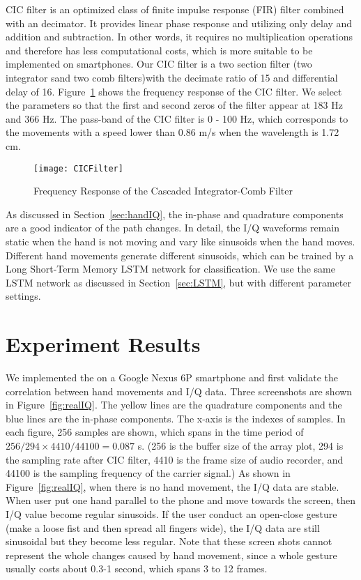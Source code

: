 CIC filter is an optimized class of finite impulse response (FIR) filter combined with an decimator. It provides linear phase response and 
utilizing only delay and addition and subtraction. In other words, it requires no multiplication operations and therefore has less computational costs, which is more suitable to be implemented on smartphones.
%
Our CIC filter is a two section filter (two integrator sand two comb filters)with the decimate ratio of 15 and differential delay of 16. Figure~\ref{fig:CICFilter} shows the frequency response of the CIC filter. We select the parameters so that the first and second zeros of the filter appear at 183 Hz and 366 Hz. The pass-band of the CIC filter is 0 - 100 Hz, which corresponds to the movements with a speed lower than 0.86 m/s when the wavelength is 1.72 cm. 

\begin{figure}[h]
	\centering
	\texttt{[image: CICFilter]}
	\caption{Frequency Response of the Cascaded Integrator-Comb Filter}
	\label{fig:CICFilter}
\end{figure}

As discussed in Section~\ref{sec:handIQ}, the in-phase and quadrature components are a good indicator of the path changes. In detail, the I/Q waveforms remain static when the hand is not moving and vary like sinusoids when the hand moves. Different hand movements generate different sinusoids, which can be trained by a Long Short-Term Memory LSTM network for classification.  We use the same LSTM network as discussed in Section~\ref{sec:LSTM}, but with different parameter settings.

\section{Experiment Results}

We implemented the {\uu} on a Google Nexus 6P smartphone and first validate the correlation between hand movements and I/Q data.
Three screenshots are shown in Figure~\ref{fig:realIQ}. The yellow lines are the quadrature components and the blue lines are the in-phase components. The x-axis is the indexes of samples. In each figure, 256 samples are shown, which spans in the time period of $256/294\times4410/44100 = 0.087$ s. (256 is the buffer size of the array plot, 294 is the sampling rate after CIC filter, 4410 is the frame size of audio recorder, and 44100 is the sampling frequency of the carrier signal.) As shown in Figure~\ref{fig:realIQ}, when there is no hand movement, the I/Q data are stable. When user put one hand parallel to the phone and move towards the screen, then I/Q value become regular sinusoids. If the user conduct an open-close gesture (make a loose fist and then spread all fingers wide), the I/Q data are still sinusoidal but they become less regular. Note that these screen shots cannot represent the whole changes caused by hand movement, since a whole gesture usually costs about 0.3-1 second, which spans 3 to 12 frames.


